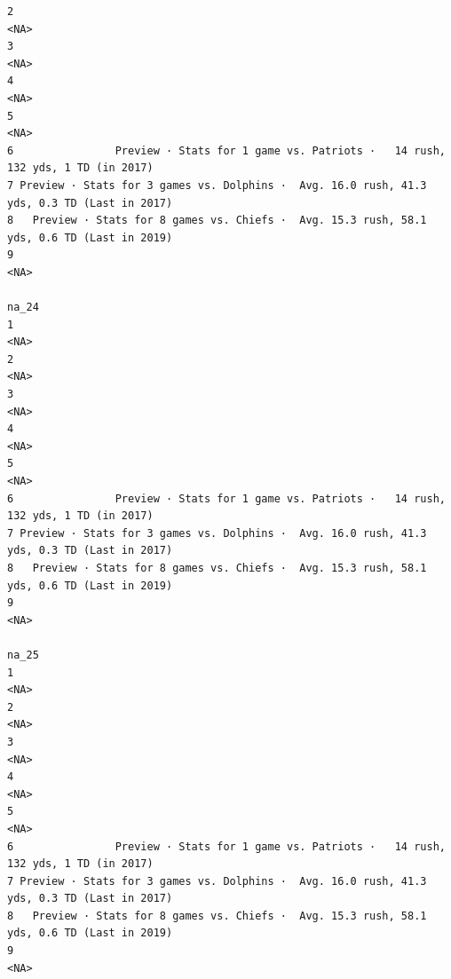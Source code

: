 \documentclass[
]{article}
\begin{document}
\begin{verbatim}
2                                                                                        <NA>
3                                                                                        <NA>
4                                                                                        <NA>
5                                                                                        <NA>
6                Preview · Stats for 1 game vs. Patriots ·   14 rush, 132 yds, 1 TD (in 2017)
7 Preview · Stats for 3 games vs. Dolphins ·  Avg. 16.0 rush, 41.3 yds, 0.3 TD (Last in 2017)
8   Preview · Stats for 8 games vs. Chiefs ·  Avg. 15.3 rush, 58.1 yds, 0.6 TD (Last in 2019)
9                                                                                        <NA>
                                                                                        na_24
1                                                                                        <NA>
2                                                                                        <NA>
3                                                                                        <NA>
4                                                                                        <NA>
5                                                                                        <NA>
6                Preview · Stats for 1 game vs. Patriots ·   14 rush, 132 yds, 1 TD (in 2017)
7 Preview · Stats for 3 games vs. Dolphins ·  Avg. 16.0 rush, 41.3 yds, 0.3 TD (Last in 2017)
8   Preview · Stats for 8 games vs. Chiefs ·  Avg. 15.3 rush, 58.1 yds, 0.6 TD (Last in 2019)
9                                                                                        <NA>
                                                                                        na_25
1                                                                                        <NA>
2                                                                                        <NA>
3                                                                                        <NA>
4                                                                                        <NA>
5                                                                                        <NA>
6                Preview · Stats for 1 game vs. Patriots ·   14 rush, 132 yds, 1 TD (in 2017)
7 Preview · Stats for 3 games vs. Dolphins ·  Avg. 16.0 rush, 41.3 yds, 0.3 TD (Last in 2017)
8   Preview · Stats for 8 games vs. Chiefs ·  Avg. 15.3 rush, 58.1 yds, 0.6 TD (Last in 2019)
9                                                                                        <NA>

\end{verbatim}
\end{document}
